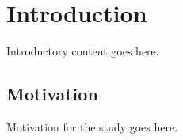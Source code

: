 \section{Introduction}

Introductory content goes here.

\subsection{Motivation}

Motivation for the study goes here.


